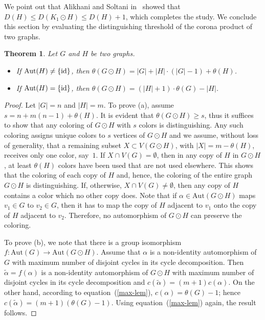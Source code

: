 \documentclass[12pt,a4paper, longbibliography]{article}
\newcommand{\id}{\ensuremath{\text{\rm id}}}
\newcommand{\aut}{\mathrm{Aut}}
\newtheorem{theorem}{{\color{THM} Theorem}}[section]
\theoremstyle{definition}
\numberwithin{equation}{section}
\begin{document}
	
	We point out that Alikhani and Soltani in~\cite{Alikhani2017corona} showed that $D(H)\leq D(K_1 \odot H)\leq D(H)+1$, which completes the study.
		We conclude this section by evaluating   the distinguishing threshold of the corona product of two graphs.
	
	
	\begin{theorem}\label{corona_theta}
		Let $G$ and $H$ be two graphs.
		
		\begin{itemize}
			\item[(a)] If $\aut(H)\neq\{\id\}$, then $\theta(G\odot H)=|G| + |H|\cdot(|G|-1) + \theta(H)$.
			
			\item[(b)] If $ \aut (H)=\{\id\}$, then $\theta(G\odot H)=(|H|+1) \cdot\theta(G)- |H|$.
		\end{itemize}
		
	\end{theorem}
	\begin{proof}
		Let $|G|=n$ and $|H|=m$. To prove  (a), assume $s=n + m(n-1) + \theta(H)$.  It is evident that $\theta(G\odot H)\geq s$, thus it suffices to show that any coloring of $G\odot H$ with $s$ colors is distinguishing. Any such coloring  assigns unique colors to  $s$ vertices of $G \odot H$ and we assume, without loss of generality, that a remaining  subset $X\subset V(G\odot H)$, with  $|X|=m-\theta(H)$, receives only one color, say~$1$.  If $X\cap V(G)= \emptyset$, then in any copy of $H$ in $G\odot H$, at least $\theta(H)$ colors have been used that are not used elsewhere. This shows that the coloring of each copy of $H$ and, hence, the coloring of the entire graph $G \odot H$ is distinguishing. If, otherwise, $X\cap V(G)\neq \emptyset$, then any copy of $H$ contains a color which no other copy does. Note  that if $\alpha\in \aut(G\odot H)$ maps $v_1\in G$ to  $v_2\in G$, then it has to map the copy of $H$ adjacent to $v_1$ onto the copy of $H$ adjacent to $v_2$. Therefore, no automorphism of $G\odot H$ can preserve the coloring. 
		
		To prove (b),  we note that there is a group  isomorphism $f:\aut(G)\to \aut(G\odot H)$.  Assume that $\alpha$ is a non-identity automorphism of $G$ with maximum number of disjoint cycles in its cycle decomposition. Then $\tilde{\alpha}=f(\alpha)$ is a non-identity automorphism of $G\odot H$ with maximum number of disjoint cycles in its cycle decomposition and $c(\tilde{\alpha})=(m+1) c(\alpha)$. On the other hand, according to equation~(\ref{max-lem}), $c(\alpha)=\theta(G)-1$; hence
		$c(\tilde{\alpha})= (m+1) (\theta(G)-1)$.
		Using equation~(\ref{max-lem}) again, the result follows.
	\end{proof}
	
\end{document}
